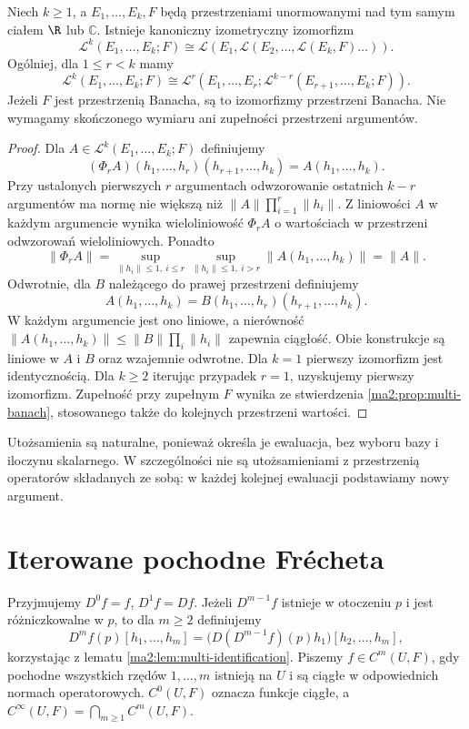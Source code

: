 \begin{twierdzenie}
\label{ma2:thm:iterated-operator-isometries}
Niech $k\ge1$, a $E_1,\ldots,E_k,F$ będą przestrzeniami
unormowanymi nad tym samym ciałem $\R$ lub $\mathbb C$.
Istnieje kanoniczny izometryczny izomorfizm
\[
 \mathcal L^k(E_1,\ldots,E_k;F)
 \cong
 \mathcal L(E_1,\mathcal L(E_2,\ldots,
                     \mathcal L(E_k,F)\ldots)).
\]
Ogólniej, dla $1\le r<k$ mamy
\[
 \mathcal L^k(E_1,\ldots,E_k;F)\cong
 \mathcal L^r(E_1,\ldots,E_r;
      \mathcal L^{k-r}(E_{r+1},\ldots,E_k;F)).
\]
Jeżeli $F$ jest przestrzenią Banacha, są to
izomorfizmy przestrzeni Banacha. Nie wymagamy
skończonego wymiaru ani zupełności przestrzeni
argumentów.
\end{twierdzenie}
\begin{proof}
Dla $A\in\mathcal L^k(E_1,\ldots,E_k;F)$
definiujemy
\[
 (\Phi_r A)(h_1,\ldots,h_r)(h_{r+1},\ldots,h_k)
       =A(h_1,\ldots,h_k).
\]
Przy ustalonych pierwszych $r$ argumentach
odwzorowanie ostatnich $k-r$ argumentów ma normę
nie większą niż $\|A\|\prod_{i=1}^r\|h_i\|$.
Z liniowości $A$ w każdym argumencie wynika
wieloliniowość $\Phi_r A$ o wartościach w przestrzeni
odwzorowań wieloliniowych. Ponadto
\[
 \|\Phi_r A\|
 =\sup_{\|h_i\|\le1,\ i\le r}
     \sup_{\|h_i\|\le1,\ i>r}\|A(h_1,\ldots,h_k)\|
 =\|A\|.
\]
Odwrotnie, dla $B$ należącego do prawej przestrzeni
definiujemy
\[
 A(h_1,\ldots,h_k)=B(h_1,\ldots,h_r)(h_{r+1},\ldots,h_k).
\]
W każdym argumencie jest ono liniowe, a nierówność
$\|A(h_1,\ldots,h_k)\|\le\|B\|\prod_i\|h_i\|$
zapewnia ciągłość. Obie konstrukcje są liniowe
w $A$ i $B$ oraz wzajemnie odwrotne.
Dla $k=1$ pierwszy izomorfizm jest identycznością.
Dla $k\ge2$ iterując przypadek $r=1$, uzyskujemy
pierwszy izomorfizm. Zupełność przy zupełnym $F$ wynika
ze stwierdzenia \ref{ma2:prop:multi-banach},
stosowanego także do kolejnych przestrzeni wartości.
\end{proof}

Utożsamienia są naturalne, ponieważ określa je
ewaluacja, bez wyboru bazy i iloczynu skalarnego.
W szczególności nie są utożsamieniami z przestrzenią
operatorów składanych ze sobą: w każdej kolejnej
ewaluacji podstawiamy nowy argument.

\section{Iterowane pochodne Frécheta}

\begin{definicja}
\label{ma2:def:ck}
Przyjmujemy $D^0f=f$, $D^1f=Df$. Jeżeli $D^{m-1}f$
istnieje w otoczeniu $p$ i jest różniczkowalne w $p$,
to dla $m\ge2$ definiujemy
\[
 D^mf(p)[h_1,\ldots,h_m]
 =\bigl(D(D^{m-1}f)(p)h_1\bigr)[h_2,\ldots,h_m],
\]
korzystając z lematu \ref{ma2:lem:multi-identification}.
Piszemy $f\in C^m(U,F)$, gdy pochodne wszystkich rzędów
$1,\ldots,m$ istnieją na $U$ i są ciągłe w odpowiednich
normach operatorowych. $C^0(U,F)$ oznacza funkcje ciągłe,
a $C^\infty(U,F)=\bigcap_{m\ge1}C^m(U,F)$.
\end{definicja}

